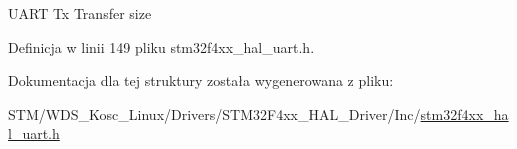 U\+A\+RT Tx Transfer size 

Definicja w linii 149 pliku stm32f4xx\+\_\+hal\+\_\+uart.\+h.



Dokumentacja dla tej struktury została wygenerowana z pliku\+:\begin{DoxyCompactItemize}
\item 
S\+T\+M/\+W\+D\+S\+\_\+\+Kosc\+\_\+\+Linux/\+Drivers/\+S\+T\+M32\+F4xx\+\_\+\+H\+A\+L\+\_\+\+Driver/\+Inc/\hyperlink{stm32f4xx__hal__uart_8h}{stm32f4xx\+\_\+hal\+\_\+uart.\+h}\end{DoxyCompactItemize}
